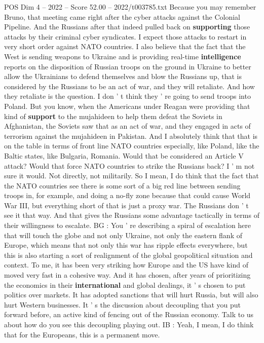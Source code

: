 \begin{textsample}{POS Dim 4 – 2022 – Score 52.00 – 2022/t003785.txt}
Because you may remember Bruno, that meeting came right after the cyber attacks against the Colonial Pipeline.
And the Russians after that indeed pulled back on \textbf{supporting} those attacks by their criminal cyber syndicates.
I expect those attacks to restart in very short order against NATO countries.
I also believe that the fact that the West is sending weapons to Ukraine and is providing real-time \textbf{intelligence} reports on the disposition of Russian troops on the ground in Ukraine to better allow the Ukrainians to defend themselves and blow the Russians up, that is considered by the Russians to be an act of war, and they will retaliate.
And how they retaliate is the question.
I don ' t think they ' re going to send troops into Poland.
But you know, when the Americans under Reagan were providing that kind of \textbf{support} to the mujahideen to help them defeat the Soviets in Afghanistan, the Soviets saw that as an act of war, and they engaged in acts of terrorism against the mujahideen in Pakistan.
And I absolutely think that that is on the table in terms of front line NATO countries especially, like Poland, like the Baltic states, like Bulgaria, Romania.
Would that be considered an Article V attack?
Would that force NATO countries to strike the Russians back?
I ' m not sure it would.
Not directly, not militarily.
So I mean, I do think that the fact that the NATO countries see there is some sort of a big red line between sending troops in, for example, and doing a no-fly zone because that could cause World War III, but everything short of that is just a proxy war.
The Russians don ' t see it that way.
And that gives the Russians some advantage tactically in terms of their willingness to escalate.
BG : You ' re describing a spiral of escalation here that will touch the globe and not only Ukraine, not only the eastern flank of Europe, which means that not only this war has ripple effects everywhere, but this is also starting a sort of realignment of the global geopolitical situation and context.
To me, it has been very striking how Europe and the US have kind of moved very fast in a cohesive way.
And it has chosen, after years of prioritizing the economics in their \textbf{international} and global dealings, it ' s chosen to put politics over markets.
It has adopted sanctions that will hurt Russia, but will also hurt Western businesses.
It ' s the discussion about decoupling that you put forward before, an active kind of fencing out of the Russian economy.
Talk to us about how do you see this decoupling playing out.
IB : Yeah, I mean, I do think that for the Europeans, this is a permanent move.

\end{textsample}
